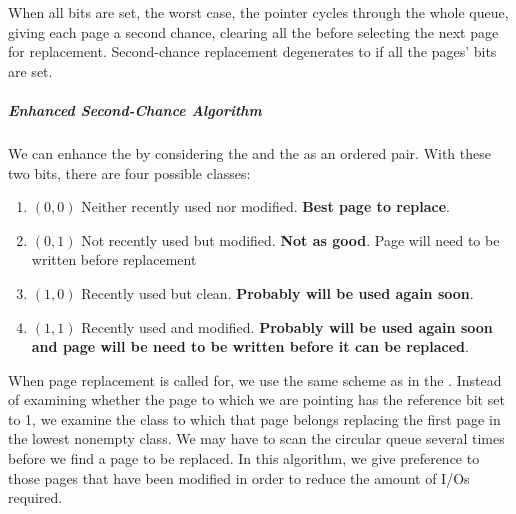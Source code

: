 When all bits are set, the worst case, the pointer cycles through the whole queue, giving each page a second chance, clearing all the  before selecting the next page for replacement.
Second-chance replacement degenerates to  if all the pages' bits are set.

\subparagraph{Enhanced Second-Chance Algorithm}\label{subpar:Enhanced_Second_Chance_Algorithm}
We can enhance the  by considering the  and the  as an ordered pair.
With these two bits, there are four possible classes:
\begin{enumerate}[noitemsep]
\item $(0, 0)$ Neither recently used nor modified. \textbf{Best page to replace}.
\item $(0, 1)$ Not recently used but modified. \textbf{Not as good}. Page will need to be written before replacement
\item $(1, 0)$ Recently used but clean. \textbf{Probably will be used again soon}.
\item $(1, 1)$ Recently used and modified. \textbf{Probably will be used again soon and page will be need to be written before it can be replaced}.
\end{enumerate}

When page replacement is called for, we use the same scheme as in the .
Instead of examining whether the page to which we are pointing has the reference bit set to 1, we examine the class to which that page belongs replacing the first page in the lowest nonempty class.
We may have to scan the circular queue several times before we find a page to be replaced.
In this algorithm, we give preference to those pages that have been modified in order to reduce the amount of I/Os required.


